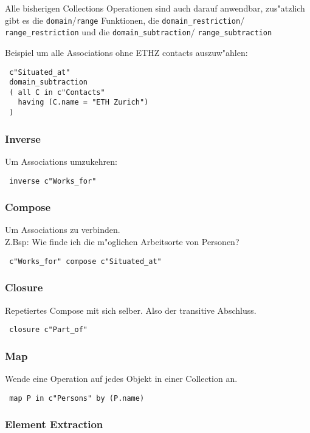 \documentclass[german, 10pt, a4paper, twocolumn]{scrartcl}
\theoremstyle{definition}
\theoremstyle{remark}
\theoremstyle{example}
\begin{document}
Alle bisherigen Collections Operationen sind auch darauf anwendbar, zus"atzlich gibt es die \texttt{domain}/\texttt{range} Funktionen, die \texttt{domain\_restriction}/ \texttt{range\_restriction} und die \texttt{domain\_subtraction}/ \texttt{range\_subtraction}

Beispiel um alle Associations ohne ETHZ contacts auszuw"ahlen:
\begin{verbatim}
 c"Situated_at"
 domain_subtraction
 ( all C in c"Contacts"
   having (C.name = "ETH Zurich")
 )
\end{verbatim}

\subsubsection{Inverse}

Um Associations umzukehren:
\begin{verbatim}
 inverse c"Works_for"
\end{verbatim}

\subsubsection{Compose}

Um Associations zu verbinden.\\

Z.Bsp: Wie finde ich die m"oglichen Arbeitsorte von Personen?
\begin{verbatim}
 c"Works_for" compose c"Situated_at"
\end{verbatim}

\subsubsection{Closure}

Repetiertes Compose mit sich selber. Also der transitive Abschluss.
\begin{verbatim}
 closure c"Part_of"
\end{verbatim}

\subsubsection{Map}

Wende eine Operation auf jedes Objekt in einer Collection an.
\begin{verbatim}
 map P in c"Persons" by (P.name)
\end{verbatim}

\subsubsection{Element Extraction}
\end{document}
